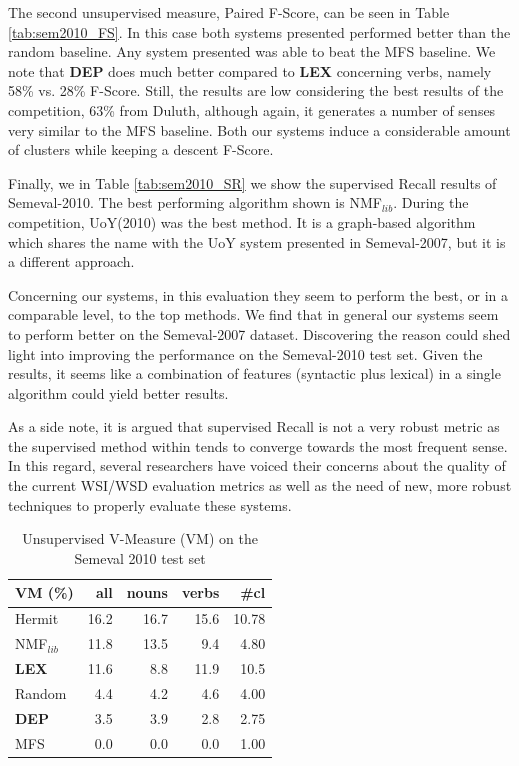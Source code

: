 The second unsupervised measure, Paired F-Score, can be seen in Table \ref{tab:sem2010_FS}. In this case both systems presented performed better than the random baseline. Any system presented was able to beat the MFS baseline. We note that \textbf{DEP} does much better compared to \textbf{LEX} concerning verbs, namely 58\% vs. 28\% F-Score. Still, the results are low considering the best results of the competition, 63\% from Duluth, although again, it generates a number of senses very similar to the MFS baseline. Both our systems induce a considerable amount of clusters while keeping a descent F-Score.

Finally, we in Table \ref{tab:sem2010_SR} we show the supervised Recall results of Semeval-2010. The best performing algorithm shown is NMF$_{lib}$. During the competition, UoY(2010) was the best method. It is a graph-based algorithm which shares the name with the UoY  system presented in Semeval-2007, but it is a different  approach. 

Concerning our systems, in this evaluation they seem to perform the best, or in a comparable level, to the top methods.  We find that in general our systems seem to perform better on the Semeval-2007 dataset. Discovering the reason could shed light into improving the performance on the Semeval-2010 test set. Given the results, it seems like a combination of features (syntactic plus lexical) in  a single algorithm could yield better results. 

As a side note, it is argued that supervised Recall is not a very robust metric as the supervised method within tends to converge towards the most frequent sense. In this regard, several researchers \cite{VandeCruys2011,pedersen2010duluth} have voiced their concerns about the quality of the current WSI/WSD evaluation metrics as well as the need of new, more robust techniques to properly evaluate these systems.

\begin{table}[]
\centering

\begin{tabular}{@{}lrrrr@{}}
\toprule
\textbf{VM (\%)} & \textbf{all} & \textbf{nouns} & \textbf{verbs} & \textbf{\#cl} \\ \midrule
{Hermit} & 16.2 & 16.7 & 15.6 & 10.78 \\
NMF$_{lib}$&11.8&13.5&9.4&4.80\\
\textbf{LEX} & 11.6 & 8.8 & 11.9 & 10.5 \\
Random & 4.4 & 4.2 & 4.6 & 4.00 \\
\textbf{DEP} & 3.5 & 3.9 & 2.8 & 2.75 \\
MFS & 0.0 & 0.0 & 0.0 & 1.00 \\ \bottomrule
\end{tabular}
\caption{Unsupervised V-Measure (VM) on the Semeval 2010 test set}
\label{tab:sem2010_VM}
\end{table}


